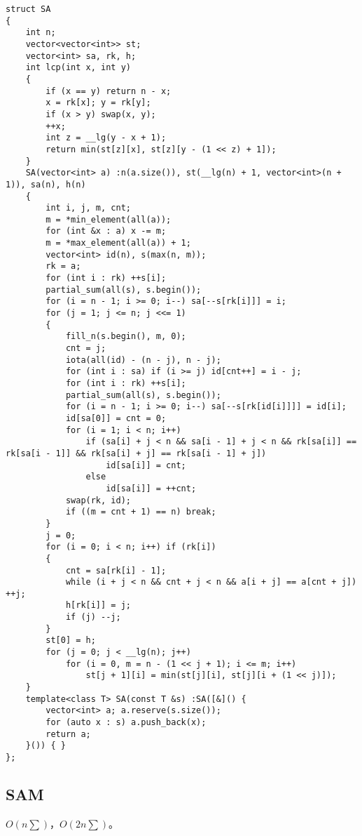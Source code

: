 \documentclass[12pt]{ctexart}
\begin{document}
\begin{lstlisting}
struct SA
{
	int n;
	vector<vector<int>> st;
	vector<int> sa, rk, h;
	int lcp(int x, int y)
	{
		if (x == y) return n - x;
		x = rk[x]; y = rk[y];
		if (x > y) swap(x, y);
		++x;
		int z = __lg(y - x + 1);
		return min(st[z][x], st[z][y - (1 << z) + 1]);
	}
	SA(vector<int> a) :n(a.size()), st(__lg(n) + 1, vector<int>(n + 1)), sa(n), h(n)
	{
		int i, j, m, cnt;
		m = *min_element(all(a));
		for (int &x : a) x -= m;
		m = *max_element(all(a)) + 1;
		vector<int> id(n), s(max(n, m));
		rk = a;
		for (int i : rk) ++s[i];
		partial_sum(all(s), s.begin());
		for (i = n - 1; i >= 0; i--) sa[--s[rk[i]]] = i;
		for (j = 1; j <= n; j <<= 1)
		{
			fill_n(s.begin(), m, 0);
			cnt = j;
			iota(all(id) - (n - j), n - j);
			for (int i : sa) if (i >= j) id[cnt++] = i - j;
			for (int i : rk) ++s[i];
			partial_sum(all(s), s.begin());
			for (i = n - 1; i >= 0; i--) sa[--s[rk[id[i]]]] = id[i];
			id[sa[0]] = cnt = 0;
			for (i = 1; i < n; i++)
				if (sa[i] + j < n && sa[i - 1] + j < n && rk[sa[i]] == rk[sa[i - 1]] && rk[sa[i] + j] == rk[sa[i - 1] + j])
					id[sa[i]] = cnt;
				else
					id[sa[i]] = ++cnt;
			swap(rk, id);
			if ((m = cnt + 1) == n) break;
		}
		j = 0;
		for (i = 0; i < n; i++) if (rk[i])
		{
			cnt = sa[rk[i] - 1];
			while (i + j < n && cnt + j < n && a[i + j] == a[cnt + j]) ++j;
			h[rk[i]] = j;
			if (j) --j;
		}
		st[0] = h;
		for (j = 0; j < __lg(n); j++)
			for (i = 0, m = n - (1 << j + 1); i <= m; i++)
				st[j + 1][i] = min(st[j][i], st[j][i + (1 << j)]);
	}
	template<class T> SA(const T &s) :SA([&]() {
		vector<int> a; a.reserve(s.size());
		for (auto x : s) a.push_back(x);
		return a;
	}()) { }
};
\end{lstlisting}

\subsection{SAM}

$O(n\sum)$，$O(2n\sum )$。
\end{document}
